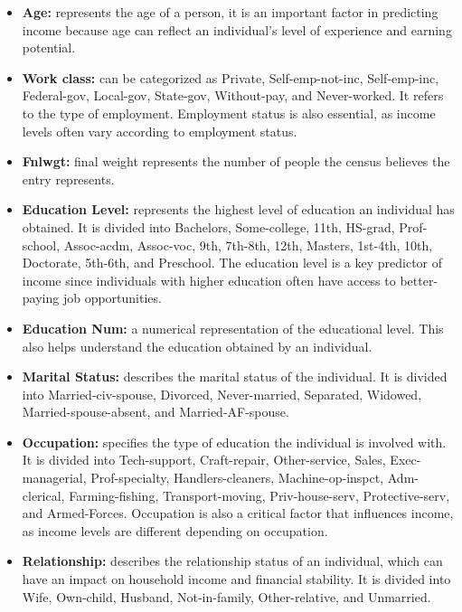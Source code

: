 \documentclass[10pt,journal,compsoc]{IEEEtran}
\begin{document}
\begin{itemize}
    \item \textbf{Age:} represents the age of a person, it is an important factor in predicting income because age can reflect an individual's level of experience and earning potential.

    \item \textbf{Work class:} can be categorized as Private, Self-emp-not-inc, Self-emp-inc, Federal-gov, Local-gov, State-gov, Without-pay, and Never-worked. It refers to the type of employment. Employment status is also essential, as income levels often vary according to employment status.

    \item \textbf{Fnlwgt:} final weight represents the number of people the census believes the entry represents.

    \item \textbf{Education Level:} represents the highest level of education an individual has obtained. It is divided into Bachelors, Some-college, 11th, HS-grad, Prof-school, Assoc-acdm, Assoc-voc, 9th, 7th-8th, 12th, Masters, 1st-4th, 10th, Doctorate, 5th-6th, and Preschool. The education level is a key predictor of income since individuals with higher education often have access to better-paying job opportunities.

    \item \textbf{Education Num:} a numerical representation of the educational level. This also helps understand the education obtained by an individual.

    \item \textbf{Marital Status:} describes the marital status of the individual. It is divided into Married-civ-spouse, Divorced, Never-married, Separated, Widowed, Married-spouse-absent, and Married-AF-spouse.

    \item \textbf{Occupation:} specifies the type of education the individual is involved with. It is divided into Tech-support, Craft-repair, Other-service, Sales, Exec-managerial, Prof-specialty, Handlers-cleaners, Machine-op-inspct, Adm-clerical, Farming-fishing, Transport-moving, Priv-house-serv, Protective-serv, and Armed-Forces. Occupation is also a critical factor that influences income, as income levels are different depending on occupation.

    \item \textbf{Relationship:} describes the relationship status of an individual, which can have an impact on household income and financial stability. It is divided into Wife, Own-child, Husband, Not-in-family, Other-relative, and Unmarried.


\end{itemize}
\end{document}
